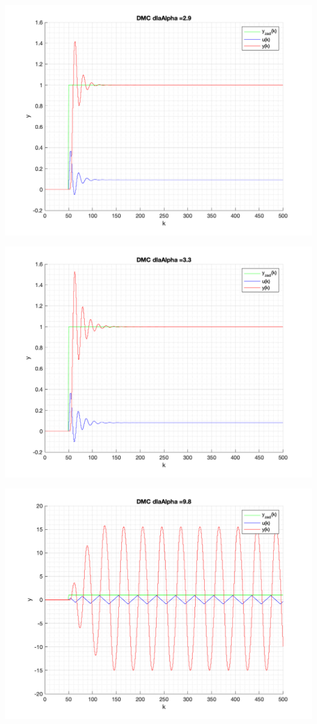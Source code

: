 \documentclass[a4paper, 11pt]{article}
\begin{document}
\begin{enumerate}
 \includegraphics[width=\linewidth]{./ModelsDodatkowe_Alpha/P4_DMC_Alpha_2_9_png.png} 
 
 \includegraphics[width=\linewidth]{./ModelsDodatkowe_Alpha/P4_DMC_Alpha_3_3_png.png} 
 
 \includegraphics[width=\linewidth]{./ModelsDodatkowe_Alpha/P4_DMC_Alpha_9_8_png.png} 
 

\end{enumerate}
\end{document}
